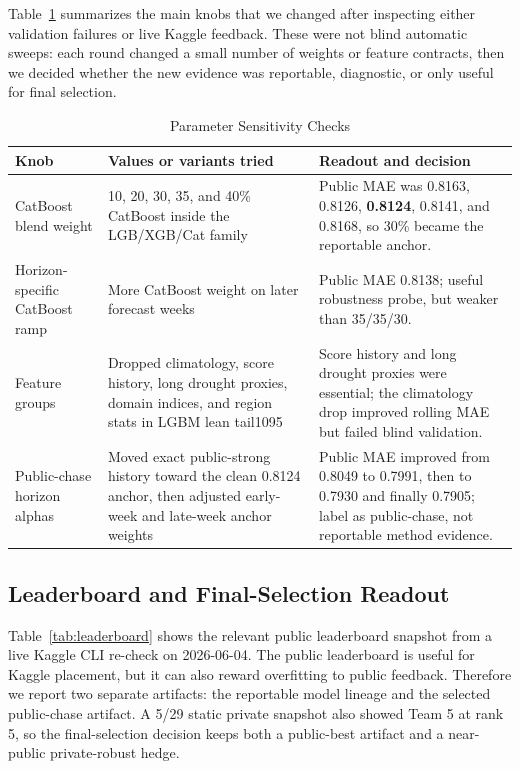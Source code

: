 \documentclass[conference]{IEEEtran}
\begin{document}
Table~\ref{tab:param_sensitivity} summarizes the main knobs that we changed
after inspecting either validation failures or live Kaggle feedback. These were
not blind automatic sweeps: each round changed a small number of weights or
feature contracts, then we decided whether the new evidence was reportable,
diagnostic, or only useful for final selection.

\begin{table}[h]
\centering
\caption{Parameter Sensitivity Checks}
\label{tab:param_sensitivity}
\scriptsize
\setlength{\tabcolsep}{2pt}
\begin{tabular}{p{}p{}p{}}
\hline
\textbf{Knob} & \textbf{Values or variants tried} & \textbf{Readout and decision} \\
\hline
CatBoost blend weight & 10, 20, 30, 35, and 40\% CatBoost inside the
LGB/XGB/Cat family & Public MAE was 0.8163, 0.8126, \textbf{0.8124}, 0.8141,
and 0.8168, so 30\% became the reportable anchor. \\
Horizon-specific CatBoost ramp & More CatBoost weight on later forecast weeks &
Public MAE 0.8138; useful robustness probe, but weaker than 35/35/30. \\
Feature groups & Dropped climatology, score history, long drought proxies,
domain indices, and region stats in LGBM lean tail1095 & Score history and long
drought proxies were essential; the climatology drop improved rolling MAE but
failed blind validation. \\
Public-chase horizon alphas & Moved exact public-strong history toward the clean
0.8124 anchor, then adjusted early-week and late-week anchor weights & Public
MAE improved from 0.8049 to 0.7991, then to 0.7930 and finally 0.7905; label as
public-chase, not reportable method evidence. \\
\hline
\end{tabular}
\end{table}

\subsection{Leaderboard and Final-Selection Readout}
Table~\ref{tab:leaderboard} shows the relevant public leaderboard snapshot
from a live Kaggle CLI re-check on 2026-06-04. The public leaderboard is useful
for Kaggle placement, but it can also reward overfitting to public feedback.
Therefore we report two separate artifacts: the reportable model lineage and
the selected public-chase artifact. A 5/29 static private snapshot also showed
Team 5 at rank 5, so the final-selection decision keeps both a public-best
artifact and a near-public private-robust hedge.
\end{document}

